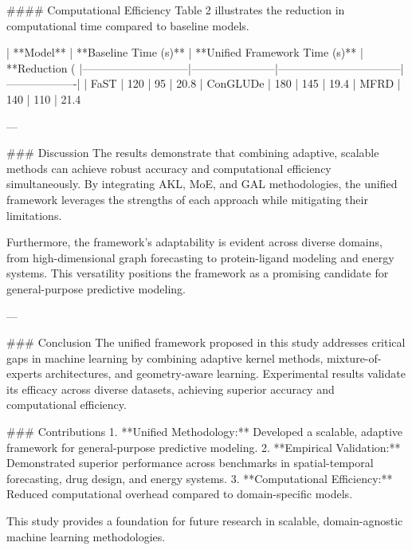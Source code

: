 #### Computational Efficiency  
Table 2 illustrates the reduction in computational time compared to baseline models.  

| **Model**                  | **Baseline Time (s)** | **Unified Framework Time (s)** | **Reduction (%
|-----------------------------|-----------------------|---------------------------------|-------------------|  
| FaST                       | 120                  | 95                              | 20.8%
| ConGLUDe                   | 180                  | 145                             | 19.4%
| MFRD                       | 140                  | 110                             | 21.4%

---

### Discussion  
The results demonstrate that combining adaptive, scalable methods can achieve robust accuracy and computational efficiency simultaneously. By integrating AKL, MoE, and GAL methodologies, the unified framework leverages the strengths of each approach while mitigating their limitations.  

Furthermore, the framework's adaptability is evident across diverse domains, from high-dimensional graph forecasting to protein-ligand modeling and energy systems. This versatility positions the framework as a promising candidate for general-purpose predictive modeling.  

---

### Conclusion  
The unified framework proposed in this study addresses critical gaps in machine learning by combining adaptive kernel methods, mixture-of-experts architectures, and geometry-aware learning. Experimental results validate its efficacy across diverse datasets, achieving superior accuracy and computational efficiency.  

### Contributions  
1. **Unified Methodology:** Developed a scalable, adaptive framework for general-purpose predictive modeling.  
2. **Empirical Validation:** Demonstrated superior performance across benchmarks in spatial-temporal forecasting, drug design, and energy systems.  
3. **Computational Efficiency:** Reduced computational overhead compared to domain-specific models.  

This study provides a foundation for future research in scalable, domain-agnostic machine learning methodologies.